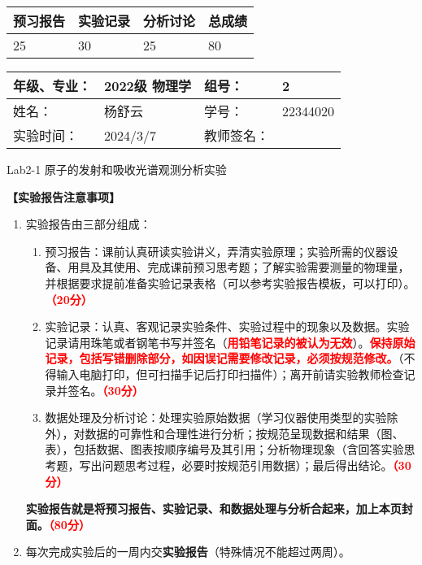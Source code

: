 \documentclass[dvipsnames, svgnames,a4paper,11pt]{article}
\begin{document}
	
	
	
	
	\begin{table}
		\renewcommand\arraystretch{1.7}
		\begin{tabularx}{\textwidth}{
				|X|X|X|X
				|X|X|X|X|}
			\hline
			\multicolumn{2}{|c|}{预习报告}&\multicolumn{2}{|c|}{实验记录}&\multicolumn{2}{|c|}{分析讨论}&\multicolumn{2}{|c|}{总成绩}\\
			\hline
			\LARGE25 & & \LARGE30 & & \LARGE25 & & \LARGE80 & \\
			\hline
		\end{tabularx}
	\end{table}
	
	\begin{table}
		\renewcommand\arraystretch{1.7}
		\begin{tabularx}{\textwidth}{|X|X|X|X|}
			\hline
			年级、专业： & 2022级 物理学 &组号： & 2\\
			\hline
			姓名： & 杨舒云  & 学号： & 22344020\\
			\hline
			实验时间： & 2024/3/7 & 教师签名： & \\
			\hline
		\end{tabularx}
	\end{table}
	
	\begin{center}
		\LARGE Lab2-1 \quad 原子的发射和吸收光谱观测分析实验
	\end{center}
	
	
	\textbf{【实验报告注意事项】}
	\begin{enumerate}
		\item 实验报告由三部分组成：
		\begin{enumerate}
			\item 预习报告：课前认真研读实验讲义，弄清实验原理；实验所需的仪器设备、用具及其使用、完成课前预习思考题；了解实验需要测量的物理量，并根据要求提前准备实验记录表格（可以参考实验报告模板，可以打印）。\textcolor{red}{\textbf{（20分）}}
			\item 实验记录：认真、客观记录实验条件、实验过程中的现象以及数据。实验记录请用珠笔或者钢笔书写并签名（\textcolor{red}{\textbf{用铅笔记录的被认为无效}}）。\textcolor{red}{\textbf{保持原始记录，包括写错删除部分，如因误记需要修改记录，必须按规范修改。}}（不得输入电脑打印，但可扫描手记后打印扫描件）；离开前请实验教师检查记录并签名。\textcolor{red}{\textbf{（30分）}}
			\item 数据处理及分析讨论：处理实验原始数据（学习仪器使用类型的实验除外），对数据的可靠性和合理性进行分析；按规范呈现数据和结果（图、表），包括数据、图表按顺序编号及其引用；分析物理现象（含回答实验思考题，写出问题思考过程，必要时按规范引用数据）；最后得出结论。\textcolor{red}{\textbf{（30分）}}
		\end{enumerate}
		\textbf{实验报告就是将预习报告、实验记录、和数据处理与分析合起来，加上本页封面。\textcolor{red}{（80分）}}
		\item 每次完成实验后的一周内交\textbf{实验报告}（特殊情况不能超过两周）。
	\end{enumerate}
	
\end{document}
